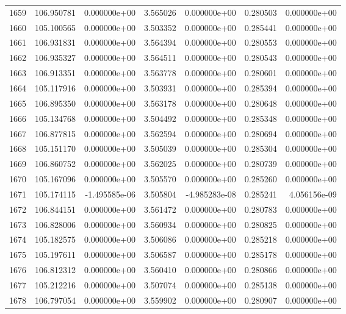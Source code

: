 \begin{tabular}{rrrrrrr}
1659 & 106.950781 &  0.000000e+00 &  3.565026 &  0.000000e+00 &    0.280503 &  0.000000e+00 \\
1660 & 105.100565 &  0.000000e+00 &  3.503352 &  0.000000e+00 &    0.285441 &  0.000000e+00 \\
1661 & 106.931831 &  0.000000e+00 &  3.564394 &  0.000000e+00 &    0.280553 &  0.000000e+00 \\
1662 & 106.935327 &  0.000000e+00 &  3.564511 &  0.000000e+00 &    0.280543 &  0.000000e+00 \\
1663 & 106.913351 &  0.000000e+00 &  3.563778 &  0.000000e+00 &    0.280601 &  0.000000e+00 \\
1664 & 105.117916 &  0.000000e+00 &  3.503931 &  0.000000e+00 &    0.285394 &  0.000000e+00 \\
1665 & 106.895350 &  0.000000e+00 &  3.563178 &  0.000000e+00 &    0.280648 &  0.000000e+00 \\
1666 & 105.134768 &  0.000000e+00 &  3.504492 &  0.000000e+00 &    0.285348 &  0.000000e+00 \\
1667 & 106.877815 &  0.000000e+00 &  3.562594 &  0.000000e+00 &    0.280694 &  0.000000e+00 \\
1668 & 105.151170 &  0.000000e+00 &  3.505039 &  0.000000e+00 &    0.285304 &  0.000000e+00 \\
1669 & 106.860752 &  0.000000e+00 &  3.562025 &  0.000000e+00 &    0.280739 &  0.000000e+00 \\
1670 & 105.167096 &  0.000000e+00 &  3.505570 &  0.000000e+00 &    0.285260 &  0.000000e+00 \\
1671 & 105.174115 & -1.495585e-06 &  3.505804 & -4.985283e-08 &    0.285241 &  4.056156e-09 \\
1672 & 106.844151 &  0.000000e+00 &  3.561472 &  0.000000e+00 &    0.280783 &  0.000000e+00 \\
1673 & 106.828006 &  0.000000e+00 &  3.560934 &  0.000000e+00 &    0.280825 &  0.000000e+00 \\
1674 & 105.182575 &  0.000000e+00 &  3.506086 &  0.000000e+00 &    0.285218 &  0.000000e+00 \\
1675 & 105.197611 &  0.000000e+00 &  3.506587 &  0.000000e+00 &    0.285178 &  0.000000e+00 \\
1676 & 106.812312 &  0.000000e+00 &  3.560410 &  0.000000e+00 &    0.280866 &  0.000000e+00 \\
1677 & 105.212216 &  0.000000e+00 &  3.507074 &  0.000000e+00 &    0.285138 &  0.000000e+00 \\
1678 & 106.797054 &  0.000000e+00 &  3.559902 &  0.000000e+00 &    0.280907 &  0.000000e+00 \\

\end{tabular}
